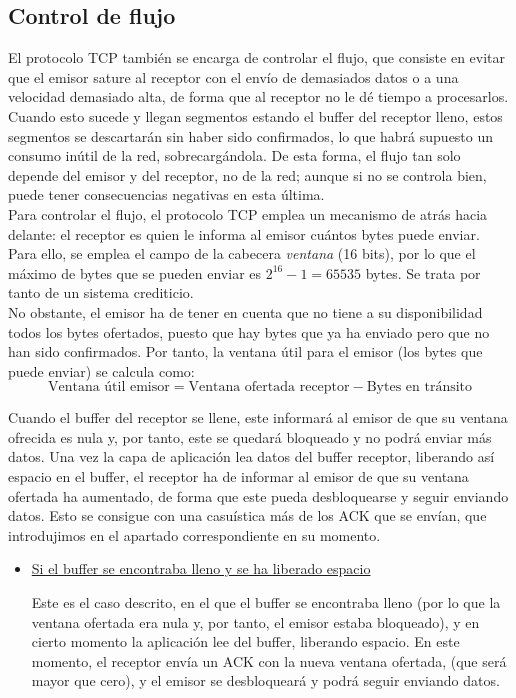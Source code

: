 \subsection{Control de flujo}

El protocolo \acrshort{TCP} también se encarga de controlar el flujo, que consiste en evitar que el emisor sature al receptor con el envío de demasiados datos o a una velocidad demasiado alta, de forma que al receptor no le dé tiempo a procesarlos. Cuando esto sucede y llegan segmentos estando el buffer del receptor lleno, estos segmentos se descartarán sin haber sido confirmados, lo que habrá supuesto un consumo inútil de la red, sobrecargándola.
De esta forma, el flujo tan solo depende del emisor y del receptor, no de la red; aunque si no se controla bien, puede tener consecuencias negativas en esta última.\\

Para controlar el flujo, el protocolo \acrshort{TCP} emplea un mecanismo de atrás hacia delante: el receptor es quien le informa al emisor cuántos bytes puede enviar. Para ello, se emplea el campo de la cabecera \textit{ventana} (16 bits), por lo que el máximo de bytes que se pueden enviar es $2^{16} - 1 = 65535$ bytes. Se trata por tanto de un sistema crediticio.\\

No obstante, el emisor ha de tener en cuenta que no tiene a su disponibilidad todos los bytes ofertados, puesto que hay bytes que ya ha enviado pero que no han sido confirmados. Por tanto, la ventana útil para el emisor (los bytes que puede enviar) se calcula como:
\begin{equation*}
    \text{Ventana útil emisor} = \text{Ventana ofertada receptor} - \text{Bytes en tránsito}
\end{equation*}

Cuando el buffer del receptor se llene, este informará al emisor de que su ventana ofrecida es nula y, por tanto, este se quedará bloqueado y no podrá enviar más datos. Una vez la capa de aplicación lea datos del buffer receptor, liberando así espacio en el buffer, el receptor ha de informar al emisor de que su ventana ofertada ha aumentado, de forma que este pueda desbloquearse y seguir enviando datos. Esto se consigue con una casuística más de los \acrshort{ACK} que se envían, que introdujimos en el apartado correspondiente en su momento.
\begin{itemize}
    \item \ul{Si el buffer se encontraba lleno y se ha liberado espacio}
    
    Este es el caso descrito, en el que el buffer se encontraba lleno (por lo que la ventana ofertada era nula y, por tanto, el emisor estaba bloqueado), y en cierto momento la aplicación lee del buffer, liberando espacio. En este momento, el receptor envía un \acrshort{ACK} con la nueva ventana ofertada, (que será mayor que cero), y el emisor se desbloqueará y podrá seguir enviando datos.
\end{itemize}

